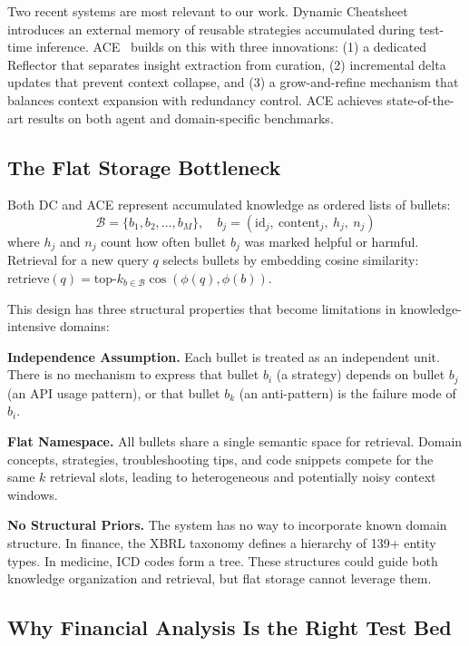\documentclass[12pt,a4paper]{article}
\begin{document}
Two recent systems are most relevant to our work. Dynamic Cheatsheet~\cite{suzgun2025dynamic} introduces an external memory of reusable strategies accumulated during test-time inference. ACE~\cite{ace2025} builds on this with three innovations: (1) a dedicated Reflector that separates insight extraction from curation, (2) incremental delta updates that prevent context collapse, and (3) a grow-and-refine mechanism that balances context expansion with redundancy control. ACE achieves state-of-the-art results on both agent and domain-specific benchmarks.

\subsection{The Flat Storage Bottleneck}
\label{sec:flat-bottleneck}

Both DC and ACE represent accumulated knowledge as ordered lists of bullets:
\begin{equation}
\mathcal{B} = \{b_1, b_2, \ldots, b_M\}, \quad b_j = (\text{id}_j,\ \text{content}_j,\ h_j,\ n_j)
\label{eq:bullets}
\end{equation}
where $h_j$ and $n_j$ count how often bullet $b_j$ was marked helpful or harmful. Retrieval for a new query $q$ selects bullets by embedding cosine similarity: $\text{retrieve}(q) = \text{top-}k_{b \in \mathcal{B}} \cos(\phi(q), \phi(b))$.

This design has three structural properties that become limitations in knowledge-intensive domains:

\textbf{Independence Assumption.} Each bullet is treated as an independent unit. There is no mechanism to express that bullet $b_i$ (a strategy) depends on bullet $b_j$ (an API usage pattern), or that bullet $b_k$ (an anti-pattern) is the failure mode of $b_i$.

\textbf{Flat Namespace.} All bullets share a single semantic space for retrieval. Domain concepts, strategies, troubleshooting tips, and code snippets compete for the same $k$ retrieval slots, leading to heterogeneous and potentially noisy context windows.

\textbf{No Structural Priors.} The system has no way to incorporate known domain structure. In finance, the XBRL taxonomy defines a hierarchy of 139+ entity types. In medicine, ICD codes form a tree. These structures could guide both knowledge organization and retrieval, but flat storage cannot leverage them.

\subsection{Why Financial Analysis Is the Right Test Bed}
\end{document}
